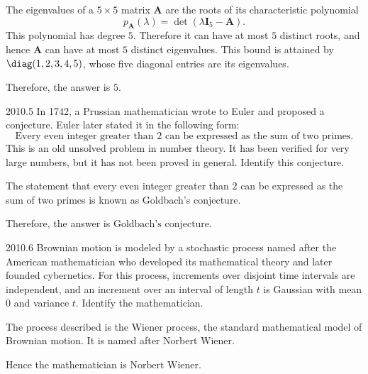     \begin{solution}
        The eigenvalues of a $5\times 5$ matrix $\mathbf{A}$ are the roots of its characteristic
        polynomial
        \[
            p_{\mathbf{A}}(\lambda)=\det(\lambda\mathbf{I}_5-\mathbf{A}).
        \]
        This polynomial has degree $5$. Therefore it can have at most $5$ distinct roots, and hence
        $\mathbf{A}$ can have at most $5$ distinct eigenvalues. This bound is attained by $\diag(1,2,3,4,5)$, whose five diagonal entries are its eigenvalues.

        Therefore, the answer is $\boxed{5}$.
    \end{solution}

    \begin{pastproblem}{2010.5}
        In 1742, a Prussian mathematician wrote to Euler and proposed a conjecture. Euler later
        stated it in the following form:
        \[
            \text{Every even integer greater than }2\text{ can be expressed as the sum of two primes.}
        \]
        This is an old unsolved problem in number theory. It has been verified for very large
        numbers, but it has not been proved in general. Identify this conjecture.
    \end{pastproblem}

    \begin{solution}
        The statement that every even integer greater than $2$ can be expressed as the sum of two
        primes is known as Goldbach's conjecture.

        Therefore, the answer is $\boxed{\text{Goldbach's conjecture}}$.
    \end{solution}

    \begin{pastproblem}{2010.6}
        Brownian motion is modeled by a stochastic process named after the
        American mathematician who developed its mathematical theory and later
        founded cybernetics. For this process, increments over disjoint time
        intervals are independent, and an increment over an interval of length
        $t$ is Gaussian with mean $0$ and variance $t$. Identify the
        mathematician.
    \end{pastproblem}

    \begin{solution}
        The process described is the Wiener process, the standard mathematical
        model of Brownian motion. It is named after Norbert Wiener.

        Hence the mathematician is $\boxed{\text{Norbert Wiener}}$.
    \end{solution}

